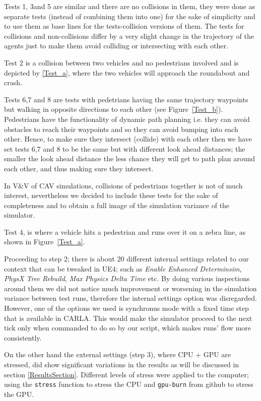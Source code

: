 Tests 1, 3and 5 are similar and there are no collisions in them, they were done as separate tests (instead of combining them into one) for the sake of simplicity and to use them as base lines for the tests-collision versions of them. The tests for collisions and non-collisions differ by a very slight change in the trajectory of the agents just to make them avoid colliding or intersecting with each other.

Test 2 is a collision between two vehicles and no pedestrians involved and is depicted by \ref{Test_a}, where the two vehicles will approach the roundabout and crash.

Tests 6,7 and 8 are tests with pedetrians having the same trajectory waypoints but walking in opposite directions to each other (see Figure~\ref{Test_b}). 
Pedestrians have the functionality of dynamic path planning i.e. they can avoid obstacles to reach their waypoints and so they can avoid bumping into each other. 
Hence, to make sure they intersect (collide) with each other then we  have set tests 6,7 and 8 to be the same but with different look ahead distances; the smaller the look ahead distance the less chance they will get to path plan around each other, and thus making sure they intersect.

In V\&V of CAV simulations, collisions of pedestrians together is not of much interest, nevertheless we decided to include these tests for the sake of completeness and to obtain a full image of the simulation variance of the simulator.

Test 4, is where a vehicle hits a pedestrian and runs over it on a zebra line, as shown in Figure~\ref{Test_a}.

Proceeding to step 2; there is about 20 different internal settings related to our context that can be tweaked in UE4; such as \textit{Enable Enhanced Determinsim}, \textit{PhysX Tree Rebuild}, \textit{Max Physics Delta Time} etc. By doing various inspections around them we did not notice much improvement or worsening in the simulation variance between test runs, therefore the internal settings option was disregarded. However, one of the options we used is synchronus mode with a fixed time step that is available in CARLA. This would make the simulator proceed to the next tick only when commanded to do so by our script, which makes runs' flow more consistently.  

On the other hand the external settings (step 3), where CPU + GPU are stressed, did show significant variations in the results as will be discussed in section \ref{ResultsSection}.
Different levels of stress were applied to the computer; using the \texttt{stress} function \cite{CPU_stress} to stress the CPU and \texttt{gpu-burn} from github \cite{GPU_stress} to stress the GPU.

